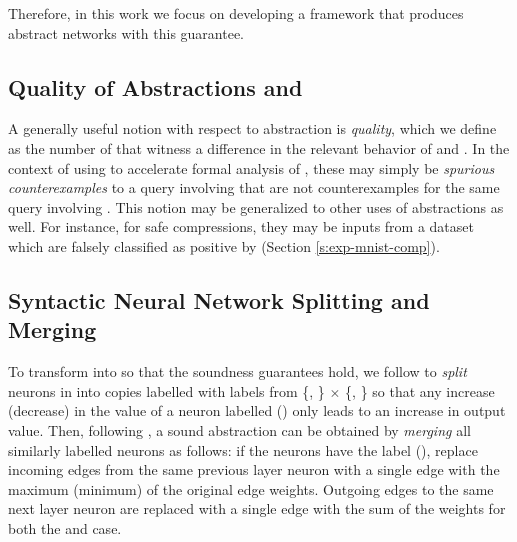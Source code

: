 Therefore, in this work we focus on developing a framework that produces
abstract networks with this guarantee.

\subsection{Quality of Abstractions and \gencex}
\label{s:qual}

A generally useful notion with respect to abstraction is \textit{quality},
which we define as the number of \textit{\gencex} that witness a difference in
the relevant behavior of \abs and \cnc. In the context of using \abs to
accelerate formal analysis of \dnn, these \gencex may simply be
\textit{spurious counterexamples} \cite{cegar-nn, cleverest-nn} to a query
involving \abs that are not counterexamples for the same query involving \cnc.
This notion may be generalized to other uses of abstractions as well. For
instance, for safe compressions, they may be inputs from a dataset which
are falsely classified as positive by \abs (Section \ref{s:exp-mnist-comp}).

\subsection{Syntactic Neural Network Splitting and Merging}
\label{s:nn-sam}

To transform \cnc into \abs so that the soundness guarantees hold, we follow
\cite{cegar-nn} to \textit{split} neurons in \cnc into copies labelled with
labels from \{\inc, \dec\} $\times$ \{\posc, \negc\} so that any
increase (decrease) in the value of a neuron labelled
\inc (\dec) only leads to an increase in output value. Then,
following \cite{cegar-nn}, a sound abstraction can be obtained by
\textit{merging} all similarly labelled neurons as follows: if the neurons have
the label \inc (\dec), replace incoming edges from the same
previous layer neuron with a single edge with the maximum (minimum) of the
original edge weights. Outgoing edges to the same next layer neuron are replaced
with a single edge with the sum of the weights for both the \inc and \dec case.



